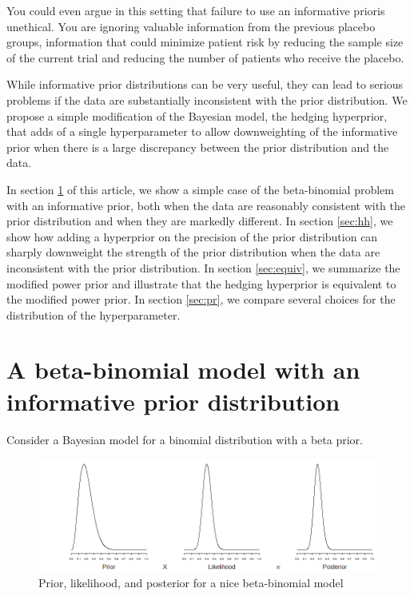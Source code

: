 \documentclass[12pt]{article}
\begin{document}
You could even argue in this setting that failure to use an informative prioris unethical. You are ignoring valuable information from the previous placebo groups, information that could minimize patient risk by reducing the sample size of the current trial and reducing the number of patients who receive the placebo.

While informative prior distributions can be very useful, they can lead to serious problems if the data are substantially inconsistent with the prior distribution. We propose a simple modification of the Bayesian model, the hedging hyperprior, that adds of a single hyperparameter to allow downweighting of the informative prior when there is a large discrepancy between the prior distribution and the data.

In section \ref{sec:bb} of this article, we show a simple case of the beta-binomial problem with an informative prior, both when the data are reasonably consistent with the prior distribution and when they are markedly different. In section \ref{sec:hh}, we show how adding a hyperprior on the precision of the prior distribution can sharply downweight the strength of the prior distribution when the data are inconsistent with the prior distribution. In section \ref{sec:equiv}, we summarize the modified power prior and illustrate that the hedging hyperprior is equivalent to the modified power prior. In section \ref{sec:pr}, we compare several choices for the distribution of the hyperparameter.

\section{A beta-binomial model with an informative prior distribution}
\label{sec:bb}
Consider a Bayesian model for a binomial distribution with a beta prior. 

\begin{figure}
\begin{center}
\includegraphics[width=6in]{fig1.png}
\end{center}
\caption{Prior, likelihood, and posterior for a nice beta-binomial model \label{fig:fig_nice}}
\end{figure}
\end{document}
